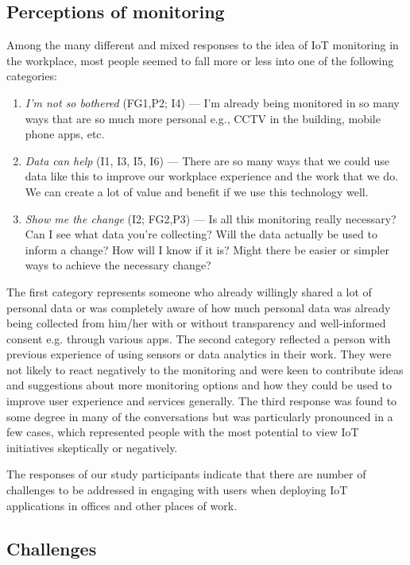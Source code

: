 \subsection{Perceptions of monitoring}
\label{sec:perc-monit}
Among the many different and mixed responses to the idea of IoT
monitoring in the workplace, most people seemed to fall more or less
into one of the following categories:
\begin{enumerate}
\item \textit{I'm not so bothered} (FG1,P2; I4) --- I'm already being monitored in so many ways
  that are so much more personal e.g., CCTV in the building, mobile
  phone apps, etc. 
\item \textit{Data can help} (I1, I3, I5, I6) --- There are so many ways that we could use
  data like this to improve our workplace experience and the work that we do. We can create a lot of value and benefit if we use this technology well. 
\item \textit{Show me the change} (I2; FG2,P3) --- Is all this monitoring really necessary?
  Can I see what data you’re collecting? Will the data actually be
  used to inform a change? How will I know if it is? Might there be
  easier or simpler ways to achieve the necessary change? 
\end{enumerate}
The first category represents someone who already willingly shared a
lot of personal data or was completely aware of how much personal data
was already being collected from him/her with or without transparency
and well-informed consent e.g. through various apps. The second
category reflected a person with previous experience of using sensors
or data analytics in their work. They were not likely to react
negatively to the monitoring and were keen to contribute ideas and
suggestions about more monitoring options and how they could be used
to improve user experience and services generally. The third response
was found to some degree in many of the conversations but was
particularly pronounced in a few cases, which represented people with
the most potential to view IoT initiatives skeptically or negatively.

The responses of our study participants indicate that there are number
of challenges to be addressed in engaging with users when deploying
IoT applications in offices and other places of work.

\subsection{Challenges}
\label{sec:challenges}

